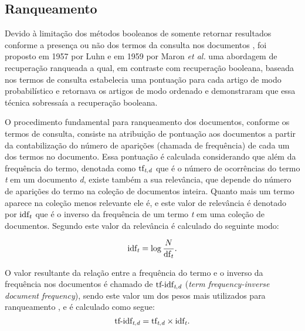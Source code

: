 \subsection{Ranqueamento} \label{subsec:Ranqueamento}
Devido à limitação dos métodos booleanos de somente retornar resultados conforme a presença ou não dos termos da consulta nos documentos \cite[p.~100]{Manning2008IIR}, foi proposto em 1957 por Luhn e em 1959 por Maron \textit{et al.} uma abordagem de recuperação ranqueada \cite[p.~1446]{Sanderson2012THIRR} a qual, em contraste com recuperação booleana, baseada nos termos de consulta estabelecia uma pontuação para cada artigo de modo probabilístico e retornava os artigos de modo ordenado e demonstraram que essa técnica sobressaía a recuperação booleana.

O procedimento fundamental para ranqueamento dos documentos, conforme os termos de consulta, consiste na atribuição de pontuação aos documentos a partir da contabilização do número de aparições (chamada de frequência) de cada um dos termos no documento.
Essa pontuação é calculada considerando que além da frequência do termo, denotada como $\text{tf}_{\text{\textit{t},\textit{d}}}$ que é o número de ocorrências do termo \textit{t} em um documento \textit{d}, existe também a sua relevância, que depende do número de aparições do termo na coleção de documentos inteira.
Quanto mais um termo aparece na coleção menos relevante ele é, e este valor de relevância é denotado por $\text{idf}_{\text{\textit{t}}}$ que é o inverso da frequência de um termo \textit{t} em uma coleção de documentos.
Segundo  este valor da relevância é calculado do seguinte modo:

\begin{equation}
    \text{idf}_{\text{\textit{t}}} = \log{\frac{N}{\text{df}_{\text{\textit{t}}}}}.
\end{equation}

O valor resultante da relação entre a frequência do termo e o inverso da frequência nos documentos é chamado de $\text{tf-idf}_{\text{\textit{t},\textit{d}}}$ (\textit{term frequency-inverse document frequency}), sendo este valor um dos pesos mais utilizados para ranqueamento \cite[p.~107--110]{Manning2008IIR}, e é calculado  como segue:
\begin{equation}
    \text{tf-idf}_{\text{\textit{t},\textit{d}}}  = \text{tf}_{\text{\textit{t},\textit{d}}} \times \text{idf}_{\text{\textit{t}}}.
\end{equation}

